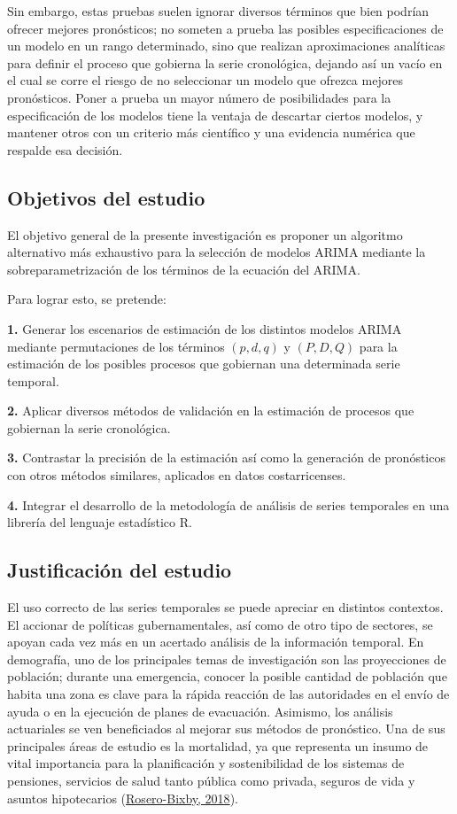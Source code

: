\documentclass[
]{article}
\begin{document}
Sin embargo, estas pruebas suelen ignorar diversos términos que bien
podrían ofrecer mejores pronósticos; no someten a prueba las posibles
especificaciones de un modelo en un rango determinado, sino que realizan
aproximaciones analíticas para definir el proceso que gobierna la serie
cronológica, dejando así un vacío en el cual se corre el riesgo de no
seleccionar un modelo que ofrezca mejores pronósticos. Poner a prueba un
mayor número de posibilidades para la especificación de los modelos
tiene la ventaja de descartar ciertos modelos, y mantener otros con un
criterio más científico y una evidencia numérica que respalde esa
decisión.

\subsection{Objetivos del estudio}

El objetivo general de la presente investigación es proponer un
algoritmo alternativo más exhaustivo para la selección de modelos ARIMA
mediante la sobreparametrización de los términos de la ecuación del
ARIMA.

Para lograr esto, se pretende:

\textbf{1.} Generar los escenarios de estimación de los distintos
modelos ARIMA mediante permutaciones de los términos \((p,d,q)\) y
\((P,D,Q)\) para la estimación de los posibles procesos que gobiernan
una determinada serie temporal.

\textbf{2.} Aplicar diversos métodos de validación en la estimación de
procesos que gobiernan la serie cronológica.

\textbf{3.} Contrastar la precisión de la estimación así como la
generación de pronósticos con otros métodos similares, aplicados en
datos costarricenses.

\textbf{4.} Integrar el desarrollo de la metodología de análisis de
series temporales en una librería del lenguaje estadístico R.

\subsection{Justificación del estudio}

El uso correcto de las series temporales se puede apreciar en distintos
contextos. El accionar de políticas gubernamentales, así como de otro
tipo de sectores, se apoyan cada vez más en un acertado análisis de la
información temporal. En demografía, uno de los principales temas de
investigación son las proyecciones de población; durante una emergencia,
conocer la posible cantidad de población que habita una zona es clave
para la rápida reacción de las autoridades en el envío de ayuda o en la
ejecución de planes de evacuación. Asimismo, los análisis actuariales se
ven beneficiados al mejorar sus métodos de pronóstico. Una de sus
principales áreas de estudio es la mortalidad, ya que representa un
insumo de vital importancia para la planificación y sostenibilidad de
los sistemas de pensiones, servicios de salud tanto pública como
privada, seguros de vida y asuntos hipotecarios
(\protect\hyperlink{ref-supenprodc}{Rosero-Bixby, 2018}).
\end{document}
